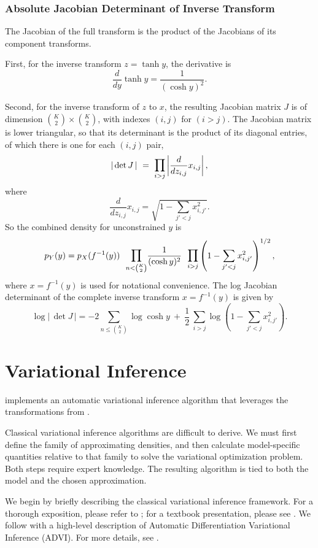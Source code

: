 \subsection{Absolute Jacobian Determinant of Inverse Transform}

The Jacobian of the full transform is the product of the Jacobians of
its component transforms.

First, for the inverse transform $z = \tanh y$, the derivative is
%
\[
\frac{d}{dy} \tanh y = \frac{1}{(\cosh y)^2}.
\]
%

Second, for the inverse transform of $z$ to $x$, the resulting
Jacobian matrix $J$ is of dimension $\binom{K}{2} \times
\binom{K}{2}$, with indexes $(i,j)$ for $(i > j)$.  The Jacobian
matrix is lower triangular, so that its determinant is the product of
its diagonal entries, of which there is one for each $(i,j)$ pair,
%
\[
\left| \, \mbox{det} \, J \, \right|
  \ = \ \mathlarger{\prod}_{i > j} \left| \frac{d}{dz_{i,j}} x_{i,j} \right|,
\]
%
where
%
\[
\frac{d}{dz_{i,j}} x_{i,j}
= \sqrt{1 - \sum_{j' < j} x^2_{i,j'}}.
\]
%
So the combined density for unconstrained $y$ is
\[
p_Y(y)
= p_X(f^{-1}(y))
  \ \
  \mathlarger{\prod}_{n < \binom{K}{2}} \frac{1}{(\cosh y)^2}
  \ \
  \mathlarger{\prod}_{i > j} \left( 1 - \sum_{j' < j} x_{i,j'}^2
  \right)^{1/2},
\]
%
where $x = f^{-1}(y)$ is used for notational convenience.  The log
Jacobian determinant of the complete inverse transform $x = f^{-1}(y)$
is given by
\[
\log \left| \, \det J \, \right|
=
-2 \sum_{n \leq \binom{K}{2}}
\log \cosh y
\
+
\
\frac{1}{2} \
\sum_{i > j}
\log \left( 1 - \sum_{j' < j} x_{i,j'}^2 \right)
.
\]


\chapter{Variational Inference}\label{vi-advanced.chapter}

\noindent
\Stan implements an automatic variational inference algorithm that leverages
the transformations from .

Classical variational inference algorithms are difficult to
derive. We must first define the family of approximating
densities, and then calculate model-specific quantities relative
to that family to solve the variational optimization problem.  Both
steps require expert knowledge.  The resulting algorithm is tied to
both the model and the chosen approximation.

We begin by briefly describing the classical variational inference framework.
For a thorough exposition, please refer to
\citet{Jordan:1999,Wainwright-Jordan:2008}; for a textbook presentation, please
see \citet{Bishop:2006}. We follow with a high-level description of Automatic
Differentiation Variational Inference (ADVI). For more details, see
\citep{Kucukelbir:2015}.


